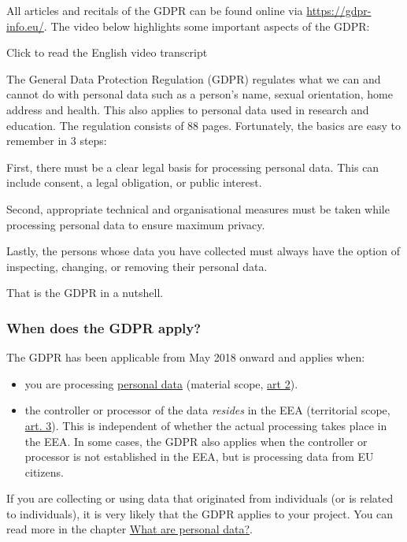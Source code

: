 \documentclass[
]{book}
\providecommand{\tightlist}{%
  \setlength{\itemsep}{0pt}\setlength{\parskip}{0pt}}
\begin{document}
All articles and recitals of the GDPR can be found online via \url{https://gdpr-info.eu/}.
The video below highlights some important aspects of the GDPR:

Click to read the English video transcript

The General Data Protection Regulation (GDPR) regulates what we can
and cannot do with personal data such as a person's name, sexual orientation,
home address and health. This also applies to personal data used in research
and education. The regulation consists of 88 pages. Fortunately, the basics
are easy to remember in 3 steps:

First, there must be a clear legal basis for processing personal data. This can
include consent, a legal obligation, or public interest.

Second, appropriate technical and organisational measures must be taken
while processing personal data to ensure maximum privacy.

Lastly, the persons whose data you have collected must always have the
option of inspecting, changing, or removing their personal data.

That is the GDPR in a nutshell.

\hypertarget{gdpr-scope}{%
\subsubsection{When does the GDPR apply?}\label{gdpr-scope}}

The GDPR has been applicable from May 2018 onward and applies when:

\begin{itemize}
\tightlist
\item
  you are processing \protect\hyperlink{personal-data}{personal data}
  (material scope, \href{https://gdpr-info.eu/art-2-gdpr/}{art 2}).
\item
  the controller or processor of the data \emph{resides} in the EEA (territorial
  scope, \href{https://gdpr-info.eu/art-3-gdpr/}{art. 3}).
  This is independent of whether the actual processing takes place in the EEA.
  In some cases, the GDPR also applies when the controller or processor is not
  established in the EEA, but is processing data from EU citizens.
\end{itemize}

If you are collecting or using data that originated from individuals (or is
related to individuals), it is very likely that the GDPR applies to your project.
You can read more in the chapter \protect\hyperlink{personal-data}{What are personal data?}.
\end{document}
